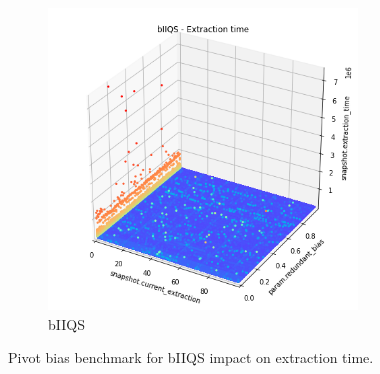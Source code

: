 \begin{figure}
\begin{subfigure}[b]{0.45\textwidth}
    \end{subfigure}
    \hfill
    \begin{subfigure}[b]{0.45\textwidth}
        \centering
        \includegraphics[width=0.9\textwidth]{./fragments/05_workhorse_experiment/images/01_basebenchmark_06_redundant_bias.png.0_0.png}
        \caption{bIIQS}
        \label{FIG:WORKHORSE_BENCHMARK_06__0_1}
    \end{subfigure}

    \caption{Pivot bias benchmark for bIIQS impact on extraction time.}
    \label{FIG:WORKHORSE_BENCHMARK_06}
\end{figure}


